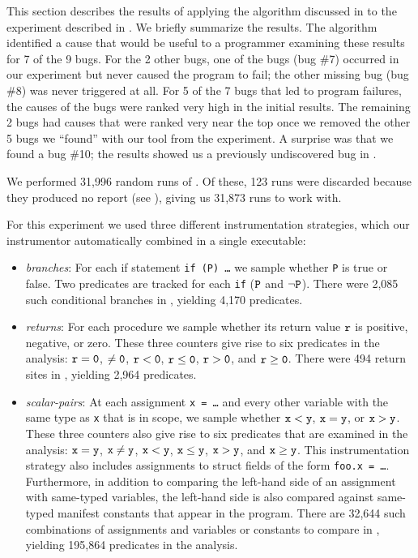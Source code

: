 
This section describes the results of applying the algorithm discussed
in  to the experiment described in
.  We briefly summarize the results.  
The algorithm identified a cause that would be useful to a programmer
examining these results for 7 of the 9 bugs.  For the 2 other bugs,
one of the bugs (bug \#7) occurred in our experiment but never caused
the program to fail; the other missing bug (bug \#8) was never
triggered at all.  For 5 of the 7 bugs that led to program failures,
the causes of the bugs were ranked very high in the initial results.  The
remaining 2 bugs had causes that were ranked very near the top once
we removed the other 5 bugs we ``found'' with our tool from the
experiment.  A surprise was that we found a bug \#10; the results
showed us a previously undiscovered bug in \moss.

We performed 31,996 random runs of \moss.  Of these, 123 runs were
discarded because they produced no report (see
), giving us 31,873 runs to work with.

For this experiment we used three different instrumentation strategies, which our
instrumentor automatically combined in a single executable:
\begin{itemize}
\item {\em branches}: For each if statement {\tt if (P) \ldots} we sample whether {\tt P} is true or false.
Two predicates are tracked for each {\tt if} ($\tt P$ and $\tt \neg P$).  There were 2,085 such conditional branches
in \moss, yielding 4,170 predicates.

\item {\em returns}: For each procedure we sample whether its return value $\tt r$ is positive, negative, or zero.
These three counters give rise to six predicates in the analysis: $\tt r = 0$, $\tt \neq 0$, $\tt r < 0$, $\tt r \leq 0$, $\tt r > 0$, and $\tt r \geq 0$.
There were 494 return sites in \moss, yielding 2,964 predicates.

\item {\em scalar-pairs}: At each assignment {\tt x = \ldots} and every other variable with the same type as {\tt x} that is in scope,
we sample whether $\tt x < y$, $\tt x = y$, or $\tt x > y$.  These
three counters also give rise to six predicates that are examined in
the analysis: $\tt x = y$, $\tt x \neq y$, $\tt x < y$, $\tt x \leq
y$, $\tt x > y$, and $\tt x \geq y$.  This instrumentation strategy 
also includes assignments to struct fields of the form {\tt foo.x =
\ldots}.  Furthermore, in addition to comparing the left-hand side of
an assignment with same-typed variables, the left-hand side is also compared against
same-typed manifest constants that appear in the program.  There are
32,644 such combinations of assignments and variables or constants
to compare in \moss, yielding 195,864 predicates in the analysis.
\end{itemize}

